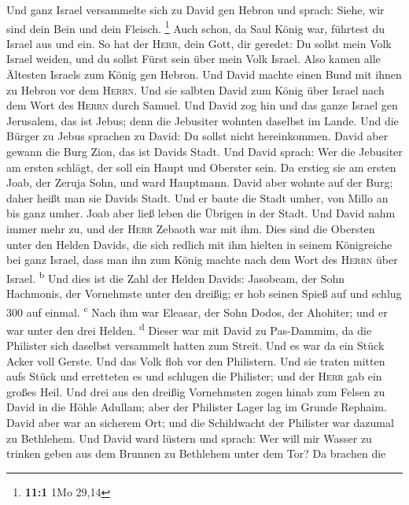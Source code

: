  Und ganz Israel versammelte sich zu David gen Hebron und
sprach: Siehe, wir sind dein Bein und dein Fleisch. \footnote{\textbf{11:1}
  1Mo 29,14}  Auch schon, da Saul König war, führtest du
Israel aus und ein. So hat der \textsc{Herr}, dein Gott, dir geredet: Du
sollst mein Volk Israel weiden, und du sollst Fürst sein über mein Volk
Israel.  Also kamen alle Ältesten Israels zum König gen
Hebron. Und David machte einen Bund mit ihnen zu Hebron vor dem
\textsc{Herrn}. Und sie salbten David zum König über Israel nach dem
Wort des \textsc{Herrn} durch Samuel.  Und David zog hin
und das ganze Israel gen Jerusalem, das ist Jebus; denn die Jebusiter
wohnten daselbst im Lande.  Und die Bürger zu Jebus
sprachen zu David: Du sollst nicht hereinkommen. David aber gewann die
Burg Zion, das ist Davids Stadt.  Und David sprach: Wer
die Jebusiter am ersten schlägt, der soll ein Haupt und Oberster sein.
Da erstieg sie am ersten Joab, der Zeruja Sohn, und ward Hauptmann.
 David aber wohnte auf der Burg; daher heißt man sie
Davids Stadt.  Und er baute die Stadt umher, von Millo an
bis ganz umher. Joab aber ließ leben die Übrigen in der Stadt.
 Und David nahm immer mehr zu, und der \textsc{Herr}
Zebaoth war mit ihm.  Dies sind die Obersten unter den
Helden Davids, die sich redlich mit ihm hielten in seinem Königreiche
bei ganz Israel, dass man ihn zum König machte nach dem Wort des
\textsc{Herrn} über Israel. \textsuperscript{b}  Und dies
ist die Zahl der Helden Davids: Jasobeam, der Sohn Hachmonis, der
Vornehmste unter den dreißig; er hob seinen Spieß auf und schlug 300 auf
einmal. \textsuperscript{c}  Nach ihm war Eleasar, der
Sohn Dodos, der Ahohiter; und er war unter den drei Helden.
\textsuperscript{d}  Dieser war mit David zu Pas-Dammim,
da die Philister sich daselbst versammelt hatten zum Streit. Und es war
da ein Stück Acker voll Gerste. Und das Volk floh vor den Philistern.
 Und sie traten mitten aufs Stück und erretteten es und
schlugen die Philister; und der \textsc{Herr} gab ein großes Heil.
 Und drei aus den dreißig Vornehmsten zogen hinab zum
Felsen zu David in die Höhle Adullam; aber der Philister Lager lag im
Grunde Rephaim.  David aber war an sicherem Ort; und die
Schildwacht der Philister war dazumal zu Bethlehem.  Und
David ward lüstern und sprach: Wer will mir Wasser zu trinken geben aus
dem Brunnen zu Bethlehem unter dem Tor?  Da brachen die
